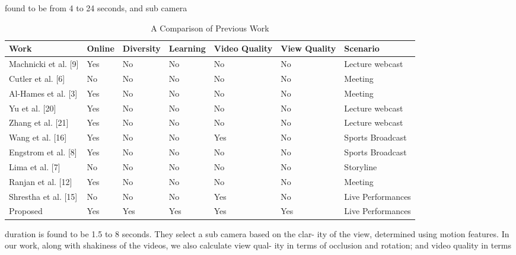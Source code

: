 \documentclass{sig-alternate}
\begin{document}
found to be from 4 to 24 seconds, and sub camera
\begin{center}
\begin{table}[ht]
\centering
\caption{A Comparison of Previous Work}
\label{my-label}
\begin{tabular}{l|l|l|l|l|l|l}
\hline
Work                     & Online & Diversity & Learning & Video Quality & View Quality & Scenario          \\ \hline
Machnicki et al. {[}9{]} & Yes    & No        & No       & No            & No           & Lecture webcast   \\ \hline
Cutler et al. {[}6{]}    & No     & No        & No       & No            & No           & Meeting           \\ \hline
Al-Hames et al. {[}3{]}  & Yes    & No        & No       & No            & No           & Meeting           \\ \hline
Yu et al. {[}20{]}       & Yes    & No        & No       & No            & No           & Lecture webcast   \\ \hline
Zhang et al. {[}21{]}    & Yes    & No        & No       & No            & No           & Lecture webcast   \\ \hline
Wang et al. {[}16{]}     & Yes    & No        & No       & Yes           & No           & Sports Broadcast  \\ \hline
Engstrom et al. {[}8{]}  & Yes    & No        & No       & No            & No           & Sports Broadcast  \\ \hline
Lima et al. {[}7{]}      & No     & No        & No       & No            & No           & Storyline         \\ \hline
Ranjan et al. {[}12{]}   & Yes    & No        & No       & No            & No           & Meeting           \\ \hline
Shrestha et al. {[}15{]} & No     & No        & No       & Yes           & No           & Live Performances \\ \hline
Proposed                 & Yes    & Yes       & Yes      & Yes           & Yes          & Live Performances \\ \hline
\end{tabular}
\end{table} 
\end{center}
duration is found
to be 1.5 to 8 seconds. They select a sub camera based on the clar-
ity of the view, determined using motion features. In our work,
along with shakiness of the videos, we also calculate view qual-
ity in terms of occlusion and rotation; and video quality in terms
\end{document}
